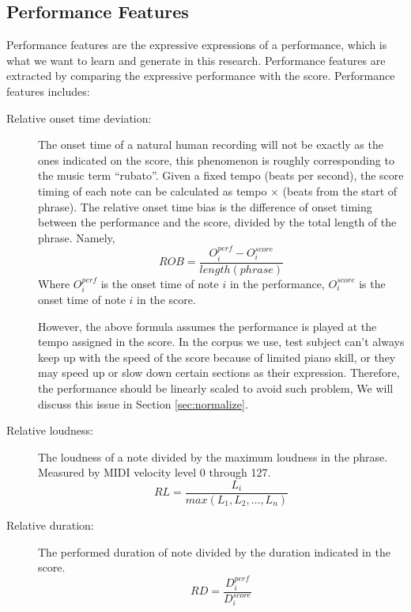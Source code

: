 \subsection{Performance Features}
   Performance features are the expressive expressions of a performance, which is what we want to learn and generate in this research. Performance features are extracted by comparing the expressive performance with the score.
      Performance features includes:
      \begin{description}
         \item [Relative onset time deviation:] 
            The onset time of a natural human recording will not be exactly as the ones indicated on the score, this phenomenon is roughly corresponding to the music term \enquote{rubato}. Given a fixed tempo (beats per second), the score timing of each note can be calculated as tempo $\times$ (beats from the start of phrase). The relative onset time bias is the difference of onset timing between the performance and the score, divided by the total length of the phrase. Namely,
            $$ ROB = \frac{O_i^{perf} - O_i^{score}  }{length(phrase)}$$ Where $O_i^{perf}$ is the onset time of note $i$ in the performance, $O_i^{score}$ is the onset time of note $i$ in the score.  

            However, the above formula assumes the performance is played at the tempo assigned in the score. In the corpus we use, test subject can't always keep up with the speed of the score because of limited piano skill, or they may speed up or slow down certain sections as their expression. Therefore, the performance should be linearly scaled to avoid such problem, We will discuss this issue in Section \ref{sec:normalize}.
         \item [Relative loudness:] The loudness of a note divided by the maximum loudness in the phrase. Measured by MIDI velocity level 0 through 127.
            $$ RL = \frac{L_i}{max(L_1, L_2, \dots, L_n)}$$

         \item [Relative duration:]
            The performed duration of note divided by the duration indicated in the score.
            $$ RD = \frac{ D_i^{perf}}{D_i^{score}}$$
      \end{description}

